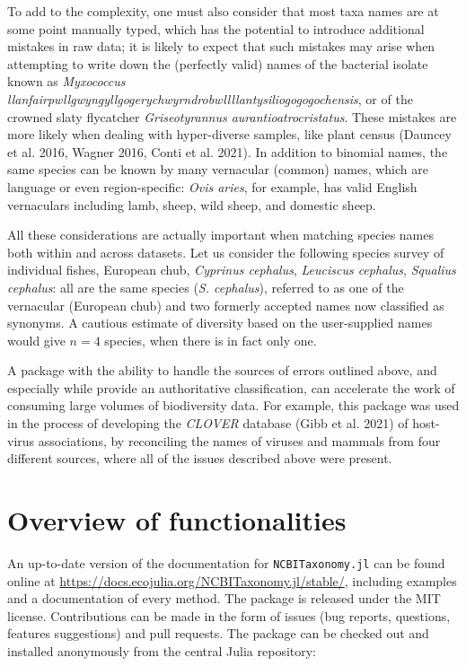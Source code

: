 \documentclass[10pt,oneside]{article}
\begin{document}
To add to the complexity, one must also consider that most taxa names
are at some point manually typed, which has the potential to introduce
additional mistakes in raw data; it is likely to expect that such
mistakes may arise when attempting to write down the (perfectly valid)
names of the bacterial isolate known as \emph{Myxococcus
llanfairpwllgwyngyllgogerychwyrndrobwllllantysiliogogogochensis}, or of
the crowned slaty flycatcher \emph{Griseotyrannus
aurantioatrocristatus}. These mistakes are more likely when dealing with
hyper-diverse samples, like plant census (Dauncey et al. 2016, Wagner
2016, Conti et al. 2021). In addition to binomial names, the same
species can be known by many vernacular (common) names, which are
language or even region-specific: \emph{Ovis aries}, for example, has
valid English vernaculars including lamb, sheep, wild sheep, and
domestic sheep.

All these considerations are actually important when matching species
names both within and across datasets. Let us consider the following
species survey of individual fishes, European chub, \emph{Cyprinus
cephalus}, \emph{Leuciscus cephalus}, \emph{Squalius cephalus}: all are
the same species (\emph{S. cephalus}), referred to as one of the
vernacular (European chub) and two formerly accepted names now
classified as synonyms. A cautious estimate of diversity based on the
user-supplied names would give \(n=4\) species, when there is in fact
only one.

A package with the ability to handle the sources of errors outlined
above, and especially while provide an authoritative classification, can
accelerate the work of consuming large volumes of biodiversity data. For
example, this package was used in the process of developing the
\emph{CLOVER} database (Gibb et al. 2021) of host-virus associations, by
reconciling the names of viruses and mammals from four different
sources, where all of the issues described above were present.

\hypertarget{overview-of-functionalities}{%
\section{Overview of
functionalities}\label{overview-of-functionalities}}

An up-to-date version of the documentation for \texttt{NCBITaxonomy.jl}
can be found online at
\url{https://docs.ecojulia.org/NCBITaxonomy.jl/stable/}, including
examples and a documentation of every method. The package is released
under the MIT license. Contributions can be made in the form of issues
(bug reports, questions, features suggestions) and pull requests. The
package can be checked out and installed anonymously from the central
Julia repository:
\end{document}
